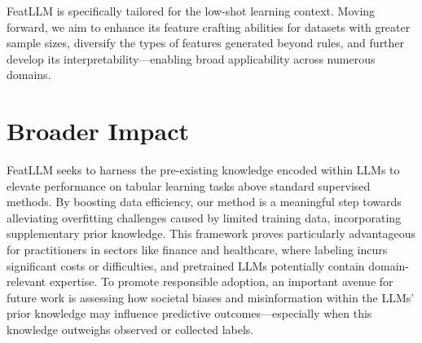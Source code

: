 \textsf{FeatLLM} is specifically tailored for the low-shot learning context. Moving forward, we aim to enhance its feature crafting abilities for datasets with greater sample sizes, diversify the types of features generated beyond rules, and further develop its interpretability—enabling broad applicability across numerous domains.

\section{Broader Impact}
\textsf{FeatLLM} seeks to harness the pre-existing knowledge encoded within LLMs to elevate performance on tabular learning tasks above standard supervised methods. By boosting data efficiency, our method is a meaningful step towards alleviating overfitting challenges caused by limited training data, incorporating supplementary prior knowledge. This framework proves particularly advantageous for practitioners in sectors like finance and healthcare, where labeling incurs significant costs or difficulties, and pretrained LLMs potentially contain domain-relevant expertise. To promote responsible adoption, an important avenue for future work is assessing how societal biases and misinformation within the LLMs’ prior knowledge may influence predictive outcomes—especially when this knowledge outweighs observed or collected labels.

